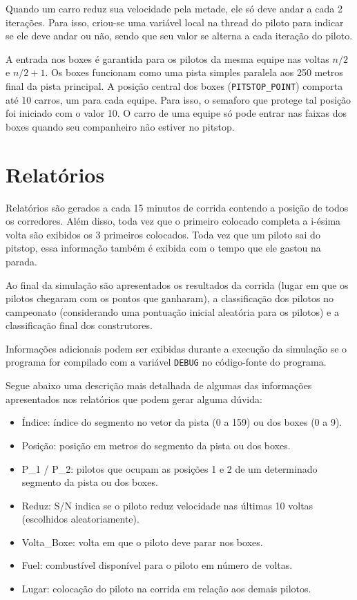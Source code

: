 \documentclass[12pt]{article}
\begin{document}
	Quando um carro reduz sua velocidade pela metade, ele só deve andar a cada 2 iterações. 
Para isso, criou-se uma variável local na thread do piloto para indicar se ele deve andar ou 
não, sendo que seu valor se alterna a cada iteração do piloto.

	A entrada nos boxes é garantida para os pilotos da mesma equipe nas voltas $n/2$ e $n/2 + 1$. 
Os boxes funcionam como uma pista simples paralela aos 250 metros final da pista principal. 
A posição central dos boxes (\verb|PITSTOP_POINT|) comporta até 10 carros, um para cada equipe. 
Para isso, o semaforo que protege tal posição foi iniciado com o valor 10. O carro de uma 
equipe só pode entrar nas faixas dos boxes quando seu companheiro não estiver no pitstop.


\section{Relatórios}

	Relatórios são gerados a cada 15 minutos de corrida contendo a posição de todos os 
corredores. Além disso, toda vez que o primeiro colocado completa a i-ésima volta são
exibidos os 3 primeiros colocados. Toda vez que um piloto sai do pitstop, essa informação 
também é exibida com o tempo que ele gastou na parada.

	Ao final da simulação são apresentados os resultados da corrida (lugar em que os pilotos 
chegaram com os pontos que ganharam), a classificação dos pilotos no campeonato (considerando 
uma pontuação inicial aleatória para os pilotos) e a classificação final dos construtores.

	Informações adicionais podem ser exibidas durante a execução da simulação se o programa
for compilado com a variável \verb|DEBUG| no código-fonte do programa. 

	Segue abaixo uma descrição mais detalhada de algumas das informações apresentados nos 
relatórios que podem gerar alguma dúvida: 
%
\begin{itemize}
	\item Índice: índice do segmento no vetor da pista (0 a 159) ou dos boxes (0 a 9).
	\item Posição: posição em metros do segmento da pista ou dos boxes. 
	\item P\_1 / P\_2: pilotos que ocupam as posições 1 e 2 de um determinado segmento da pista 
  ou dos boxes.
	\item Reduz: S/N indica se o piloto reduz velocidade nas últimas 10 voltas (escolhidos 
  aleatoriamente).	
	\item Volta\_Boxe: volta em que o piloto deve parar nos boxes.
	\item Fuel: combustível disponível para o piloto em número de voltas.
	\item Lugar: colocação do piloto na corrida em relação aos demais pilotos.
\end{itemize}
\end{document}
